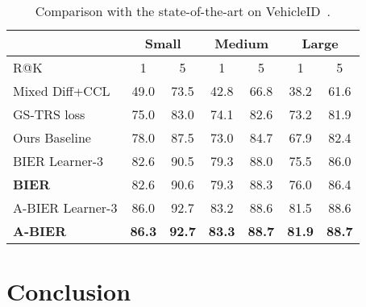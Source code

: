 \documentclass[10pt,journal,compsoc]{IEEEtran}
\begin{document}
\begin{table}[!h]
\caption{Comparison with the state-of-the-art on VehicleID~\cite{liu2016deep}.}
\label{tbl:sota-vehicleid}
\renewcommand{\arraystretch}{1.3}
\centering
\begin{tabular}{l|cc|cc|cc}
\hline
                        & \multicolumn{2}{c}{Small} & \multicolumn{2}{c}{Medium} & \multicolumn{2}{c}{Large} \\
\hline
R@K                               & 1    & 5    & 1    & 5    & 1    & 5 \\
\hline
Mixed Diff+CCL~\cite{liu2016deep} & 49.0 & 73.5 & 42.8 & 66.8 & 38.2 & 61.6 \\
GS-TRS loss~\cite{bai2017intraclassvar} & 75.0 & 83.0 & 74.1 & 82.6 & 73.2 & 81.9 \\
\hline
Ours Baseline                       & 78.0          & 87.5          & 73.0          & 84.7           & 67.9          & 82.4 \\
BIER Learner-3~\cite{opitz2017bier} & 82.6 & 90.5          & 79.3 & 88.0           & 75.5          & 86.0 \\
\textbf{BIER}~\cite{opitz2017bier}  & 82.6 & 90.6 & 79.3 & 88.3  & 76.0 & 86.4 \\
\hline
A-BIER Learner-3        & 86.0          & 92.7          & 83.2          & 88.6 & 81.5           &  88.6              \\
\textbf{A-BIER}         & \textbf{86.3} & \textbf{92.7} & \textbf{83.3} & \textbf{88.7} & \textbf{81.9}  &  \textbf{88.7}              \\
\hline

\end{tabular}
\end{table}\section{Conclusion}\label{sec:conclusion}
\end{document}
